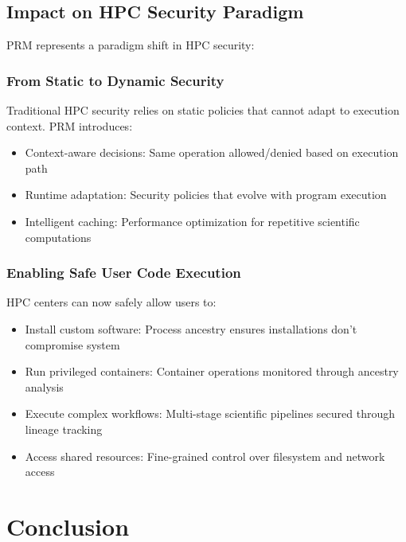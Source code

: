 \documentclass[]{sn-jnl}
\begin{document}
\subsection{Impact on HPC Security Paradigm}

PRM represents a paradigm shift in HPC security:

\subsubsection{From Static to Dynamic Security}

Traditional HPC security relies on static policies that cannot adapt to execution
context. PRM introduces:
\begin{itemize}
\item Context-aware decisions: Same operation allowed/denied based on execution path
\item Runtime adaptation: Security policies that evolve with program execution
\item Intelligent caching: Performance optimization for repetitive scientific
      computations
\end{itemize}

\subsubsection{Enabling Safe User Code Execution}

HPC centers can now safely allow users to:
\begin{itemize}
\item Install custom software: Process ancestry ensures installations don't
      compromise system
\item Run privileged containers: Container operations monitored through ancestry
      analysis
\item Execute complex workflows: Multi-stage scientific pipelines secured through
      lineage tracking
\item Access shared resources: Fine-grained control over filesystem and network
      access
\end{itemize}

\section{Conclusion}
\label{sec:conclusion}
\end{document}
